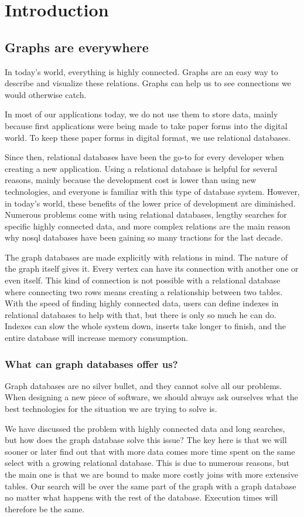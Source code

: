 \chapter{Introduction}

\section{Graphs are everywhere}

In today's world, everything is highly connected. Graphs are an easy way to describe and visualize these relations. Graphs can help us to see connections we would otherwise catch.

In most of our applications today, we do not use them to store data, mainly because first applications were being made to take paper forms into the digital world. To keep these paper forms in digital format, we use relational databases.

Since then, relational databases have been the go-to for every developer when creating a new application. Using a relational database is helpful for several reasons, mainly because the development cost is lower than using new technologies, and everyone is familiar with this type of database system. However, in today's world, these benefits of the lower price of development are diminished. Numerous problems come with using relational databases,
lengthy searches for specific highly connected data, and more complex relations are the main reason why \Gls{nosql} databases have been gaining so many tractions for the last decade.

The graph databases are made explicitly with relations in mind. The nature of the graph itself gives it. Every vertex can have its connection with another one or even itself. This kind of connection is not possible with a relational database where connecting two rows means creating a relationship between two tables. With the speed of finding highly connected data, users can define indexes in relational databases to help with that, but there is only so much he can do. Indexes can slow the whole system down, inserts take longer to finish, and the entire database will increase memory consumption.

\subsection{What can graph databases offer us?}
Graph databases are no silver bullet, and they cannot solve all our problems. When designing a new piece of software, we should always ask ourselves what the best technologies for the situation we are trying to solve is.

We have discussed the problem with highly connected data and long searches, but how does the graph database solve this issue? The key here is that we will sooner or later find out that with more data comes more time spent on the same select with a growing relational database. This is due to numerous reasons, but the main one is that we are bound to make more costly joins with more extensive tables. Our search will be over the same part of the graph with a graph database no matter what happens with the rest of the database. Execution times will therefore be the same.
